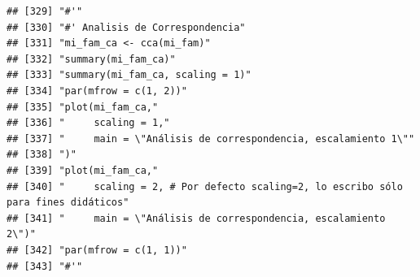 \documentclass[11pt,]{article}
\begin{document}
\begin{verbatim}
## [329] "#'"                                                                                                                                                                    
## [330] "#' Analisis de Correspondencia"                                                                                                                                        
## [331] "mi_fam_ca <- cca(mi_fam)"                                                                                                                                              
## [332] "summary(mi_fam_ca)"                                                                                                                                                    
## [333] "summary(mi_fam_ca, scaling = 1)"                                                                                                                                       
## [334] "par(mfrow = c(1, 2))"                                                                                                                                                  
## [335] "plot(mi_fam_ca,"                                                                                                                                                       
## [336] "     scaling = 1,"                                                                                                                                                     
## [337] "     main = \"Análisis de correspondencia, escalamiento 1\""                                                                                                           
## [338] ")"                                                                                                                                                                     
## [339] "plot(mi_fam_ca,"                                                                                                                                                       
## [340] "     scaling = 2, # Por defecto scaling=2, lo escribo sólo para fines didáticos"                                                                                       
## [341] "     main = \"Análisis de correspondencia, escalamiento 2\")"                                                                                                          
## [342] "par(mfrow = c(1, 1))"                                                                                                                                                  
## [343] "#'"                                                                                                                                                                    

\end{verbatim}
\end{document}
